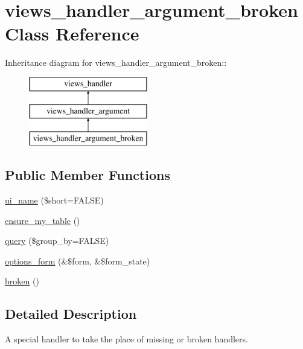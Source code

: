 \hypertarget{classviews__handler__argument__broken}{
\section{views\_\-handler\_\-argument\_\-broken Class Reference}
\label{classviews__handler__argument__broken}
}
Inheritance diagram for views\_\-handler\_\-argument\_\-broken::\begin{figure}[H]
\begin{center}
\leavevmode
\includegraphics[height=3cm]{classviews__handler__argument__broken}
\end{center}
\end{figure}
\subsection*{Public Member Functions}
\begin{DoxyCompactItemize}
\item 
\hyperlink{classviews__handler__argument__broken_ac62b831ae47250571ae7449906c1687d}{ui\_\-name} (\$short=FALSE)
\item 
\hyperlink{classviews__handler__argument__broken_a479772a6b1f448d4edf3ff3eef988733}{ensure\_\-my\_\-table} ()
\item 
\hyperlink{classviews__handler__argument__broken_a2697e474f3439165001a9a56f82e0e6d}{query} (\$group\_\-by=FALSE)
\item 
\hyperlink{classviews__handler__argument__broken_adc6789177dec1350859832bc7b242454}{options\_\-form} (\&\$form, \&\$form\_\-state)
\item 
\hyperlink{classviews__handler__argument__broken_afb6937305424b7b8a2e6fb9e3d4ef1fb}{broken} ()
\end{DoxyCompactItemize}


\subsection{Detailed Description}
A special handler to take the place of missing or broken handlers. 


